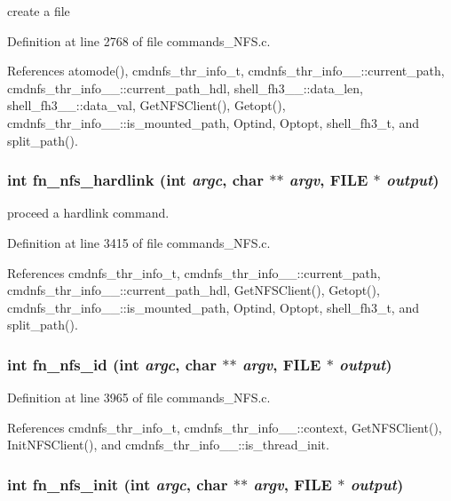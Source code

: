 create a file 

Definition at line 2768 of file commands\_\-NFS.c.

References atomode(), cmdnfs\_\-thr\_\-info\_\-t, cmdnfs\_\-thr\_\-info\_\-\_\-::current\_\-path, cmdnfs\_\-thr\_\-info\_\-\_\-::current\_\-path\_\-hdl, shell\_\-fh3\_\-\_\-::data\_\-len, shell\_\-fh3\_\-\_\-::data\_\-val, Get\-NFSClient(), Getopt(), cmdnfs\_\-thr\_\-info\_\-\_\-::is\_\-mounted\_\-path, Optind, Optopt, shell\_\-fh3\_\-t, and split\_\-path().
\subsubsection{\setlength{\rightskip}{0pt plus 5cm}int fn\_\-nfs\_\-hardlink (int {\em argc}, char $\ast$$\ast$ {\em argv}, FILE $\ast$ {\em output})}\label{commands__NFS_8c_a51}


proceed a hardlink command. 

Definition at line 3415 of file commands\_\-NFS.c.

References cmdnfs\_\-thr\_\-info\_\-t, cmdnfs\_\-thr\_\-info\_\-\_\-::current\_\-path, cmdnfs\_\-thr\_\-info\_\-\_\-::current\_\-path\_\-hdl, Get\-NFSClient(), Getopt(), cmdnfs\_\-thr\_\-info\_\-\_\-::is\_\-mounted\_\-path, Optind, Optopt, shell\_\-fh3\_\-t, and split\_\-path().
\subsubsection{\setlength{\rightskip}{0pt plus 5cm}int fn\_\-nfs\_\-id (int {\em argc}, char $\ast$$\ast$ {\em argv}, FILE $\ast$ {\em output})}\label{commands__NFS_8c_a55}




Definition at line 3965 of file commands\_\-NFS.c.

References cmdnfs\_\-thr\_\-info\_\-t, cmdnfs\_\-thr\_\-info\_\-\_\-::context, Get\-NFSClient(), Init\-NFSClient(), and cmdnfs\_\-thr\_\-info\_\-\_\-::is\_\-thread\_\-init.
\subsubsection{\setlength{\rightskip}{0pt plus 5cm}int fn\_\-nfs\_\-init (int {\em argc}, char $\ast$$\ast$ {\em argv}, FILE $\ast$ {\em output})}\label{commands__NFS_8c_a22}


